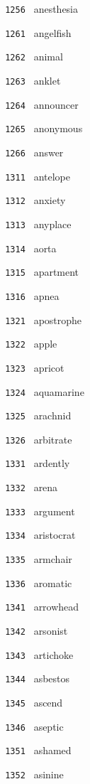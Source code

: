 \documentclass[11pt]{article}
\begin{document}
\begin{multicols}{6}
\noindent \texttt{ 1256 } anesthesia  \par
\noindent \texttt{ 1261 } angelfish  \par
\noindent \texttt{ 1262 } animal  \par
\noindent \texttt{ 1263 } anklet  \par
\noindent \texttt{ 1264 } announcer  \par
\noindent \texttt{ 1265 } anonymous  \par
\noindent \texttt{ 1266 } answer  \par
\noindent \texttt{ 1311 } antelope  \par
\noindent \texttt{ 1312 } anxiety  \par
\noindent \texttt{ 1313 } anyplace  \par
\noindent \texttt{ 1314 } aorta  \par
\noindent \texttt{ 1315 } apartment  \par
\noindent \texttt{ 1316 } apnea  \par
\noindent \texttt{ 1321 } apostrophe  \par
\noindent \texttt{ 1322 } apple  \par
\noindent \texttt{ 1323 } apricot  \par
\noindent \texttt{ 1324 } aquamarine  \par
\noindent \texttt{ 1325 } arachnid  \par
\noindent \texttt{ 1326 } arbitrate  \par
\noindent \texttt{ 1331 } ardently  \par
\noindent \texttt{ 1332 } arena  \par
\noindent \texttt{ 1333 } argument  \par
\noindent \texttt{ 1334 } aristocrat  \par
\noindent \texttt{ 1335 } armchair  \par
\noindent \texttt{ 1336 } aromatic  \par
\noindent \texttt{ 1341 } arrowhead  \par
\noindent \texttt{ 1342 } arsonist  \par
\noindent \texttt{ 1343 } artichoke  \par
\noindent \texttt{ 1344 } asbestos  \par
\noindent \texttt{ 1345 } ascend  \par
\noindent \texttt{ 1346 } aseptic  \par
\noindent \texttt{ 1351 } ashamed  \par
\noindent \texttt{ 1352 } asinine  \par

\end{multicols}
\end{document}
